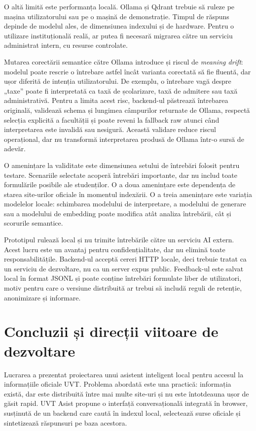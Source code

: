 \documentclass[12pt,a4paper]{report}
\theoremstyle{definition}
\theoremstyle{remark}
\begin{document}
O altă limită este performanța locală. Ollama și Qdrant trebuie să ruleze pe mașina utilizatorului sau pe o mașină de demonstrație. Timpul de răspuns depinde de modelul ales, de dimensiunea indexului și de hardware. Pentru o utilizare instituțională reală, ar putea fi necesară migrarea către un serviciu administrat intern, cu resurse controlate.

Mutarea corectării semantice către Ollama introduce și riscul de \textit{meaning drift}: modelul poate rescrie o întrebare astfel încât varianta corectată să fie fluentă, dar ușor diferită de intenția utilizatorului. De exemplu, o întrebare vagă despre „taxe” poate fi interpretată ca taxă de școlarizare, taxă de admitere sau taxă administrativă. Pentru a limita acest risc, backend-ul păstrează întrebarea originală, validează schema și lungimea câmpurilor returnate de Ollama, respectă selecția explicită a facultății și poate reveni la fallback raw atunci când interpretarea este invalidă sau nesigură. Această validare reduce riscul operațional, dar nu transformă interpretarea produsă de Ollama într-o sursă de adevăr.

O amenințare la validitate este dimensiunea setului de întrebări folosit pentru testare. Scenariile selectate acoperă întrebări importante, dar nu includ toate formulările posibile ale studenților. O a doua amenințare este dependența de starea site-urilor oficiale în momentul indexării. O a treia amenințare este variația modelelor locale: schimbarea modelului de interpretare, a modelului de generare sau a modelului de embedding poate modifica atât analiza întrebării, cât și scorurile semantice.

Prototipul rulează local și nu trimite întrebările către un serviciu AI extern. Acest lucru este un avantaj pentru confidențialitate, dar nu elimină toate responsabilitățile. Backend-ul acceptă cereri HTTP locale, deci trebuie tratat ca un serviciu de dezvoltare, nu ca un server expus public. Feedback-ul este salvat local în format JSONL și poate conține întrebări formulate liber de utilizatori, motiv pentru care o versiune distribuită ar trebui să includă reguli de retenție, anonimizare și informare.

\chapter{Concluzii și direcții viitoare de dezvoltare}

Lucrarea a prezentat proiectarea unui asistent inteligent local pentru accesul la informațiile oficiale UVT. Problema abordată este una practică: informația există, dar este distribuită între mai multe site-uri și nu este întotdeauna ușor de găsit rapid. UVT Asist propune o interfață conversațională integrată în browser, susținută de un backend care caută în indexul local, selectează surse oficiale și sintetizează răspunsuri pe baza acestora.
\end{document}
